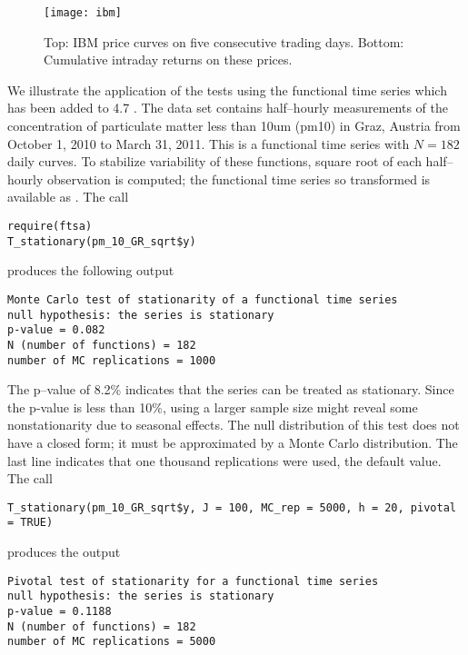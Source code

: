 \documentclass[nojss]{jss}
\begin{document}
\begin{figure}[!hbtp]
\centering
\texttt{[image: ibm]}
\caption{Top: IBM price curves on five consecutive trading days. Bottom: Cumulative intraday returns on these prices.}\label{f:cidr}
\end{figure}

We illustrate the application of the tests using the functional time series  which has been added to  4.7 \citep{ftsa}. The data set  contains half--hourly measurements of the concentration of particulate matter less than 10um (pm10) in Graz, Austria from October 1, 2010 to March 31, 2011. This is a functional time series with $N=182$ daily curves. To stabilize variability of these functions, square root of each half--hourly observation is computed; the functional time series so transformed is  available as . The call 
\begin{Verbatim}
require(ftsa)
T_stationary(pm_10_GR_sqrt$y)
\end{Verbatim} 
produces the following output
\begin{small}
\begin{Verbatim} 
Monte Carlo test of stationarity of a functional time series
null hypothesis: the series is stationary
p-value = 0.082
N (number of functions) = 182
number of MC replications = 1000
\end{Verbatim}
\end{small}
The p--value of 8.2\% indicates that the series can be treated as stationary. Since the p-value is less than 10\%, using a larger sample size might reveal some nonstationarity due to seasonal effects. The null distribution of this test does not have a closed form; it must be approximated by a Monte Carlo distribution. The last line indicates that one thousand replications were used, the default value. The call 
\begin{Verbatim} 
T_stationary(pm_10_GR_sqrt$y, J = 100, MC_rep = 5000, h = 20, pivotal = TRUE)
\end{Verbatim} 
produces the output 
\begin{small}
\begin{Verbatim} 
Pivotal test of stationarity for a functional time series
null hypothesis: the series is stationary
p-value = 0.1188
N (number of functions) = 182
number of MC replications = 5000
\end{Verbatim}
\end{small}
\end{document}
